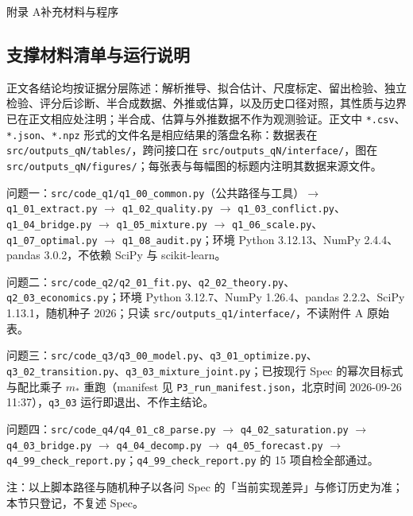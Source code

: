 \newpage
\begin{center}{\heiti\large 附录 A\quad 补充材料与程序}\end{center}
\setcounter{subsection}{0}
\renewcommand{\thesubsection}{A.\arabic{subsection}}

\subsection{支撑材料清单与运行说明}

正文各结论均按证据分层陈述：解析推导、拟合估计、尺度标定、留出检验、独立检验、评分后诊断、半合成数据、外推或估算，以及历史口径对照，其性质与边界已在正文相应处注明；半合成、估算与外推数据不作为观测验证。正文中 \texttt{*.csv}、\texttt{*.json}、\texttt{*.npz} 形式的文件名是相应结果的落盘名称：数据表在 \texttt{src/outputs\_qN/tables/}，跨问接口在 \texttt{src/outputs\_qN/interface/}，图在 \texttt{src/outputs\_qN/figures/}；每张表与每幅图的标题内注明其数据来源文件。

问题一：\texttt{src/code\_q1/q1\_00\_common.py}（公共路径与工具）$\to$ \texttt{q1\_01\_extract.py} $\to$ \texttt{q1\_02\_quality.py} $\to$ \texttt{q1\_03\_conflict.py}、\texttt{q1\_04\_bridge.py} $\to$ \texttt{q1\_05\_mixture.py} $\to$ \texttt{q1\_06\_scale.py}、\texttt{q1\_07\_optimal.py} $\to$ \texttt{q1\_08\_audit.py}；环境 Python 3.12.13、NumPy 2.4.4、pandas 3.0.2，不依赖 SciPy 与 scikit-learn。

问题二：\texttt{src/code\_q2/q2\_01\_fit.py}、\texttt{q2\_02\_theory.py}、\texttt{q2\_03\_economics.py}；环境 Python 3.12.7、NumPy 1.26.4、pandas 2.2.2、SciPy 1.13.1，随机种子 $2026$；只读 \texttt{src/outputs\_q1/interface/}，不读附件 A 原始表。

问题三：\texttt{src/code\_q3/q3\_00\_model.py}、\texttt{q3\_01\_optimize.py}、\texttt{q3\_02\_transition.py}、\texttt{q3\_03\_mixture\_joint.py}；已按现行 Spec 的幂次目标式与配比乘子 $m_*$ 重跑（manifest 见 \texttt{P3\_run\_manifest.json}，北京时间 2026-09-26 11:37），\texttt{q3\_03} 运行即退出、不作主结论。

问题四：\texttt{src/code\_q4/q4\_01\_c8\_parse.py} $\to$ \texttt{q4\_02\_saturation.py} $\to$ \texttt{q4\_03\_bridge.py} $\to$ \texttt{q4\_04\_decomp.py} $\to$ \texttt{q4\_05\_forecast.py} $\to$ \texttt{q4\_99\_check\_report.py}；\texttt{q4\_99\_check\_report.py} 的 15 项自检全部通过。

注：以上脚本路径与随机种子以各问 Spec 的「当前实现差异」与修订历史为准；本节只登记，不复述 Spec。


